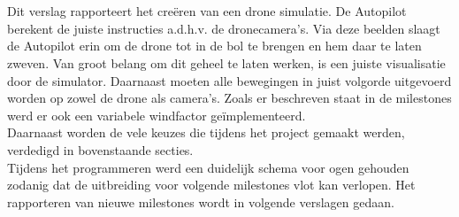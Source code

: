 \\
\\
Dit verslag rapporteert het cre\"eren van een drone simulatie. De Autopilot berekent de juiste instructies a.d.h.v. de dronecamera's. Via deze beelden slaagt de Autopilot erin om de drone tot in de bol te brengen en hem daar te laten zweven. Van groot belang om dit geheel te laten werken, is een juiste visualisatie door de simulator. Daarnaast moeten alle bewegingen in juist volgorde uitgevoerd worden op zowel de drone als camera's. Zoals er beschreven staat in de milestones werd er ook een variabele windfactor ge\"implementeerd.
\\ 
Daarnaast worden de vele keuzes die tijdens het project gemaakt werden, verdedigd in bovenstaande secties.
\\
Tijdens het programmeren werd een duidelijk schema voor ogen gehouden zodanig dat de uitbreiding voor volgende milestones vlot kan verlopen. Het rapporteren van nieuwe milestones wordt in volgende verslagen gedaan.\\